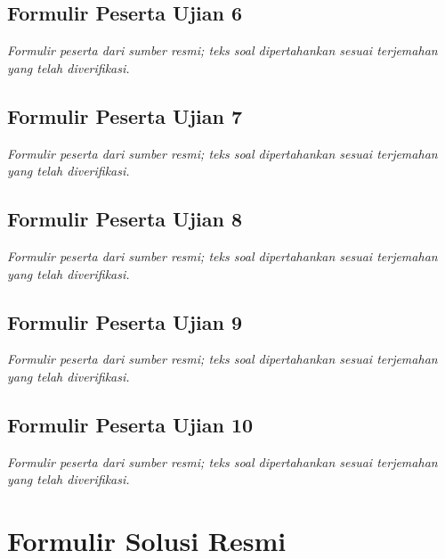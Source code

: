 \documentclass[11pt,a4paper,oneside]{book}
\begin{document}
\chapter{Formulir Peserta Ujian 6}
\noindent\textit{Formulir peserta dari sumber resmi; teks soal dipertahankan sesuai terjemahan yang telah diverifikasi.}
\begingroup
\renewcommand{\theHfakt}{o011.exam.learner.06.\arabic{fakt}}

\endgroup

\chapter{Formulir Peserta Ujian 7}
\noindent\textit{Formulir peserta dari sumber resmi; teks soal dipertahankan sesuai terjemahan yang telah diverifikasi.}
\begingroup
\renewcommand{\theHfakt}{o011.exam.learner.07.\arabic{fakt}}

\endgroup

\chapter{Formulir Peserta Ujian 8}
\noindent\textit{Formulir peserta dari sumber resmi; teks soal dipertahankan sesuai terjemahan yang telah diverifikasi.}
\begingroup
\renewcommand{\theHfakt}{o011.exam.learner.08.\arabic{fakt}}

\endgroup

\chapter{Formulir Peserta Ujian 9}
\noindent\textit{Formulir peserta dari sumber resmi; teks soal dipertahankan sesuai terjemahan yang telah diverifikasi.}
\begingroup
\renewcommand{\theHfakt}{o011.exam.learner.09.\arabic{fakt}}

\endgroup

\chapter{Formulir Peserta Ujian 10}
\noindent\textit{Formulir peserta dari sumber resmi; teks soal dipertahankan sesuai terjemahan yang telah diverifikasi.}
\begingroup
\renewcommand{\theHfakt}{o011.exam.learner.10.\arabic{fakt}}

\endgroup

\part{Formulir Solusi Resmi}
\end{document}
